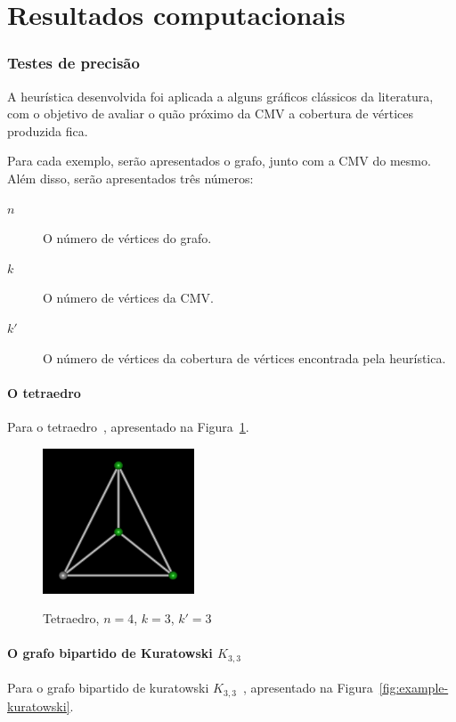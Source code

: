 \part{Resultados computacionais}
\label{sec:resultados}

\section{Testes de precisão}
A heurística desenvolvida foi aplicada a alguns gráficos clássicos da
literatura, com o objetivo de avaliar o quão próximo da CMV a
cobertura de vértices produzida fica.

Para cada exemplo, serão apresentados o grafo, junto com a
CMV do mesmo. Além disso, serão apresentados três números:
\begin{description}
    \item[$n$] O número de vértices do grafo.
    \item[$k$] O número de vértices da CMV.
    \item[$k'$] O número de vértices da cobertura de vértices
    encontrada pela heurística.
\end{description}

\subsection{O tetraedro}
Para o tetraedro~\cite{cite:example-plato},
apresentado na Figura~\ref{fig:example-tetraedro}.

\begin{figure}[htb]
\centering
\includegraphics[width=0.4\textwidth]{img/tetraedro.png}
\label{fig:example-tetraedro}
\caption{Tetraedro, $n=4$, $k=3$, $k'=3$}
\end{figure}

\subsection{O grafo bipartido de Kuratowski $K_{3,3}$}
Para o grafo bipartido de kuratowski
$K_{3,3}$~\cite{cite:example-kuratowski},
apresentado na Figura~\ref{fig:example-kuratowski}.

